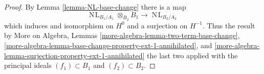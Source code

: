 \documentclass[10pt,a4paper]{amsart}
\theoremstyle{plain}
\theoremstyle{definition}
\theoremstyle{remark}
\numberwithin{equation}{subsection}
\def\NL{\mathop{N\!L}\nolimits}
\begin{document}
\begin{proof}
By Lemma \ref{lemma-NL-base-change} there is a map
$$
\NL_{B_1/A_1} \otimes_{B_2} B_1 \to \NL_{B_2/A_2}
$$
which induces and isomorphism on $H^0$ and a surjection on $H^{-1}$.
Thus the result by More on Algebra, Lemmas
\ref{more-algebra-lemma-two-term-base-change},
\ref{more-algebra-lemma-base-change-property-ext-1-annihilated}, and
\ref{more-algebra-lemma-surjection-property-ext-1-annihilated}
the last two applied with the principal ideals $(f_1) \subset B_1$ and
$(f_2) \subset B_2$.
\end{proof}
\end{document}
